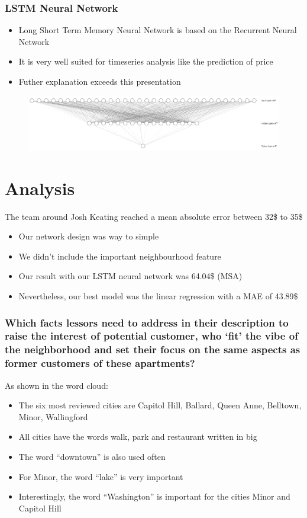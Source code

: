 \documentclass{beamer}
\begin{document}
\begin{frame}
\frametitle{LSTM Neural Network}
\begin{itemize}
\item Long Short Term Memory Neural Network is based on the Recurrent Neural Network
\item It is very well suited for timeseries analysis like the prediction of price
\item Futher explanation exceeds this presentation
\end{itemize}
\begin{figure}
\includegraphics[width=0.8\linewidth]{photo/nn}
\end{figure}
\end{frame}

\section{Analysis}
\begin{frame}
The team around Josh Keating reached a mean absolute error between 32\$ to 35\$
\begin{itemize}
\item Our network design was way to simple
\item We didn't include the important neighbourhood feature
\item Our result with our LSTM neural network was 64.04\$ (MSA)
\item Nevertheless, our best model was the linear regression with a MAE of 43.89\$
\end{itemize}
\end{frame}


\begin{frame}
\frametitle{Which facts lessors need to address in their description to raise the interest of potential customer, who ‘fit’ the vibe of the neighborhood and set their focus on the same aspects as former customers of these apartments?}
As shown in the word cloud:
\begin{itemize}
\item The six most reviewed cities are Capitol Hill, Ballard, Queen Anne, Belltown, Minor, Wallingford 
\item All cities have the words walk, park and restaurant written in big
\item The word “downtown” is also used often
\item For Minor, the word “lake” is very important
\item Interestingly, the word “Washington” is important for the cities Minor and Capitol Hill
\end{itemize}
\end{frame}
\end{document}
